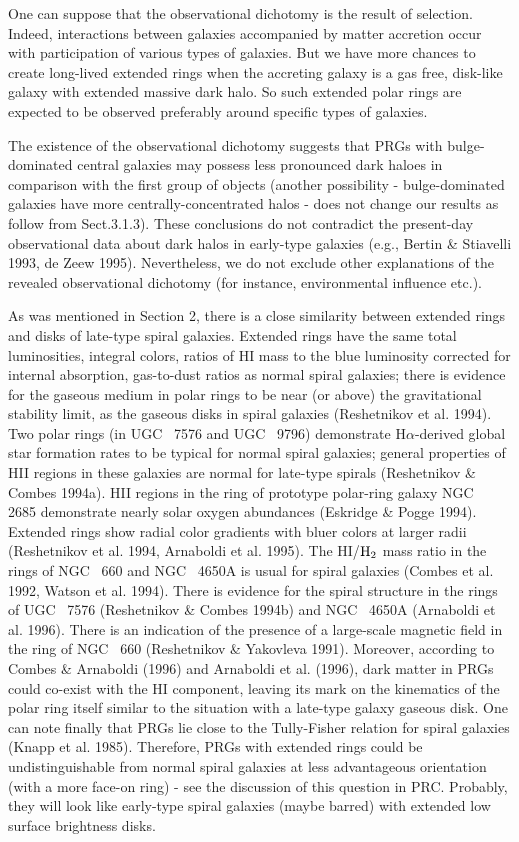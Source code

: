 One can suppose that the observational
dichotomy is the result of selection. Indeed, interactions between
galaxies accompanied by matter accretion occur with participation
of various types of galaxies. But we have more chances to create
long-lived extended rings when the accreting galaxy is a gas free, 
disk-like galaxy
with extended massive dark halo. So such extended polar rings 
are expected to be observed
preferably around specific types
of galaxies.

The existence of the
observational dichotomy suggests that PRGs with bulge-dominated
central galaxies may possess less
pronounced dark haloes in comparison with the first group of objects
(another possibility - bulge-dominated galaxies have more
centrally-concentrated halos - does not change our results as 
follow from Sect.3.1.3). These conclusions do not contradict the present-day 
observational data about dark halos in early-type galaxies (e.g., 
Bertin \& Stiavelli 1993, de Zeew 1995). 
Nevertheless, we do not exclude other explanations of the revealed
observational dichotomy (for instance, environmental influence etc.).

As was mentioned in Section 2, there is a close similarity 
between extended rings and disks of late-type spiral galaxies. 
Extended rings have the same total 
luminosities, integral colors, ratios of HI mass to the blue luminosity 
corrected for internal absorption, gas-to-dust 
ratios as normal spiral galaxies; 
there is evidence for the gaseous medium in polar 
rings to be near (or above) the gravitational stability limit, as 
the gaseous disks in spiral galaxies (Reshetnikov et al. 1994). 
Two polar rings (in UGC~ 7576 and UGC~ 9796) demonstrate 
H$\alpha$-derived global star formation rates to be typical 
for normal spiral galaxies; general properties of HII regions 
in these galaxies are normal for late-type spirals 
(Reshetnikov \& Combes 1994a). HII regions in the ring of
prototype polar-ring galaxy NGC~ 2685 demonstrate nearly
solar oxygen abundances (Eskridge \& Pogge 1994).
Extended rings show radial color
gradients with bluer colors at larger radii (Reshetnikov et al. 1994,
Arnaboldi et al. 1995). The HI/$\rm H_{2}$ mass ratio in the rings
of NGC~ 660 and NGC~ 4650A is usual for spiral galaxies 
(Combes et al. 1992, Watson et al. 1994). There is evidence for  
the spiral structure in the rings of UGC~ 7576 
(Reshetnikov \& Combes 1994b) and NGC~ 4650A
(Arnaboldi et al. 1996). There is an indication of the presence 
of a large-scale magnetic field in the ring of NGC~ 660 
(Reshetnikov \& Yakovleva 1991). Moreover, according to 
Combes \& Arnaboldi (1996) and Arnaboldi et al. (1996), dark matter 
in PRGs could co-exist with the HI component, leaving its mark on 
the kinematics of the polar ring itself similar to the situation 
with a late-type galaxy gaseous disk. One can note finally that PRGs 
lie close to the Tully-Fisher relation 
for spiral galaxies (Knapp et al. 1985). Therefore, PRGs with extended 
rings could be undistinguishable from normal spiral galaxies at 
less advantageous orientation (with a more face-on ring) - see the 
discussion of this question in PRC. Probably, they will look like 
early-type spiral galaxies (maybe barred) with extended low surface 
brightness disks. 

